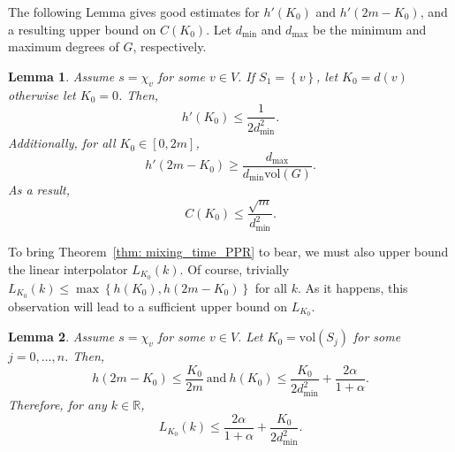 \documentclass{article}
\newcommand{\Reals}{\mathbb{R}}
\newcommand{\vol}{\mathrm{vol}}
\newcommand{\set}[1]{\left\{#1\right\}}
\newcommand{\1}{\mathbf{1}}
\theoremstyle{alden}
\theoremstyle{aldenthm}
\newtheorem{lemma}{Lemma}
\theoremstyle{remark}
\begin{document}
The following Lemma gives good estimates for $h'(K_0)$ and $h'(2m - K_0)$, and a resulting upper bound on $C(K_0)$. Let $d_{\min}$ and $d_{\max}$ be the minimum and maximum degrees of $G$, respectively. 
\begin{lemma}
	\label{lem:linearization_bound}
	Assume $s = \chi_v$ for some $v \in V$. If $S_1 = \set{v}$, let $K_0 = d(v)$ otherwise let $K_0 = 0$. Then, 
	\begin{equation}
	\label{eqn:left_derivative}
	h'(K_0) \leq  \frac{1}{2d_{\min}^2}.
	\end{equation}
	Additionally, for all $K_0 \in [0,2m]$,
	\begin{equation}
	\label{eqn:right_derivative}
	h'(2m - K_0) \geq \frac{d_{\max}}{d_{\min}\vol(G)}.
	\end{equation}
	As a result,
	\begin{equation*}
	C(K_0) \leq \frac{\sqrt{m}}{d_{\min}^2}.
	\end{equation*}
\end{lemma}

To bring Theorem~\ref{thm: mixing_time_PPR} to bear, we must also upper bound the linear interpolator $L_{K_0}(k)$. Of course, trivially $L_{K_0}(k) \leq \max\set{h(K_0), h(2m - K_0)}$ for all $k$. As it happens, this observation will lead to a sufficient upper bound on $L_{K_0}$.
\begin{lemma}
	\label{lem:interpolator_bound}
	Assume $s = \chi_v$ for some $v \in V$. Let $K_0 = \vol(S_j)$ for some $j = 0,\ldots,n$. Then, 
	\begin{equation*}
	h(2m - K_0) \leq \frac{K_0}{2m} ~\mathrm{and}~ h(K_0) \leq \frac{K_0}{2d_{\min}^2} + \frac{2\alpha}{1 + \alpha}.
	\end{equation*}
	Therefore, for any $k \in \Reals$,
	\begin{equation*}
	L_{K_0}(k) \leq \frac{2\alpha}{1 + \alpha} + \frac{K_0}{2d_{\min}^2}.
	\end{equation*}
\end{lemma}
\end{document}
